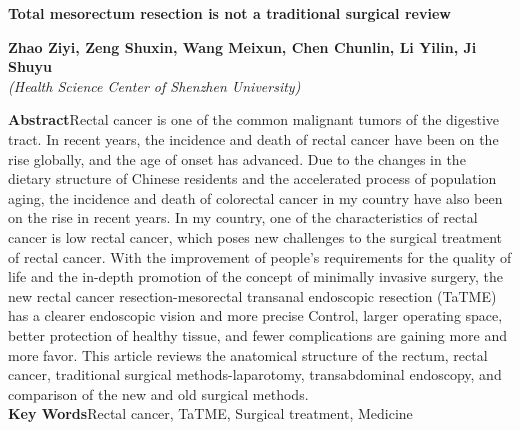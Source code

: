 \documentclass[a4paper,11pt,onecolumn,twoside]{article}
\begin{document}
\vspace{.1cm}
\begin{center}
    \parbox{\textwidth}{
    \begin{center}
        {\large{\textbf{Total mesorectum resection is not a traditional surgical review}}}\\[4pt]
        \vspace{-0.5cm}\end{center}
    \begin{center}
        \textbf{Zhao Ziyi, Zeng Shuxin, Wang Meixun, Chen Chunlin, Li Yilin, Ji Shuyu}\\[2pt]
        \small{\textit{(Health Science Center of Shenzhen University)}}\\[2pt]
    \end{center}
    {\small{\textbf{Abstract}\quad Rectal cancer is one of the common malignant tumors of the digestive tract. In recent years, the incidence and death of rectal cancer have been on the rise globally, and the age of onset has advanced. Due to the changes in the dietary structure of Chinese residents and the accelerated process of population aging, the incidence and death of colorectal cancer in my country have also been on the rise in recent years. In my country, one of the characteristics of rectal cancer is low rectal cancer, which poses new challenges to the surgical treatment of rectal cancer. With the improvement of people’s requirements for the quality of life and the in-depth promotion of the concept of minimally invasive surgery, the new rectal cancer resection-mesorectal transanal endoscopic resection (TaTME) has a clearer endoscopic vision and more precise Control, larger operating space, better protection of healthy tissue, and fewer complications are gaining more and more favor. This article reviews the anatomical structure of the rectum, rectal cancer, traditional surgical methods-laparotomy, transabdominal endoscopy, and comparison of the new and old surgical methods.
        \\
        \textbf{Key Words}\quad Rectal cancer, TaTME, Surgical treatment, Medicine}}
    }
\end{center}

\setlength{\oddsidemargin}{-.5cm}
\setlength{\evensidemargin}{\oddsidemargin}
\setlength{\textwidth}{17.00cm}
\end{document}
